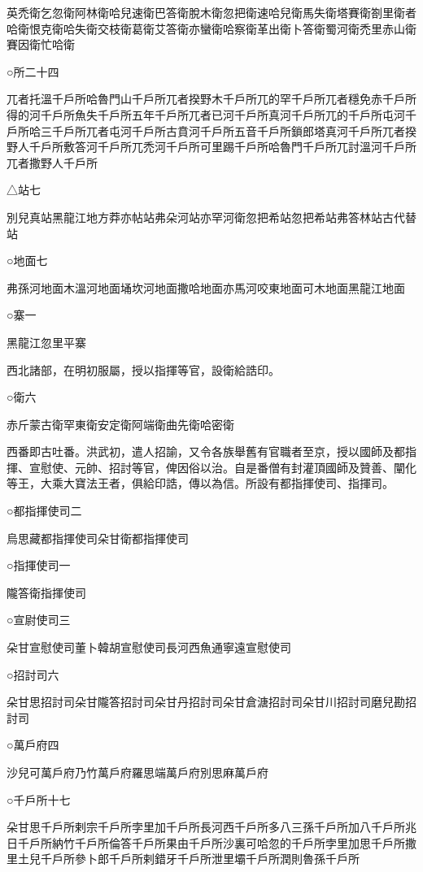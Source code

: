 英禿衛乞忽衛阿林衛哈兒速衛巴答衛脫木衛忽把衛速哈兒衛馬失衛塔賽衛劄里衛者哈衛恨克衛哈失衛交枝衛葛衛艾答衛亦蠻衛哈察衛革出衛卜答衛蜀河衛禿里赤山衛賽因衛忙哈衛

○所二十四

兀者托溫千戶所哈魯門山千戶所兀者揆野木千戶所兀的罕千戶所兀者穩免赤千戶所得的河千戶所魚失千戶所五年千戶所兀者已河千戶所真河千戶所兀的千戶所屯河千戶所哈三千戶所兀者屯河千戶所古賁河千戶所五音千戶所鎖郎塔真河千戶所兀者揆野人千戶所敷答河千戶所兀禿河千戶所可里踢千戶所哈魯門千戶所兀討溫河千戶所兀者撒野人千戶所

△站七

別兒真站黑龍江地方莽亦帖站弗朵河站亦罕河衛忽把希站忽把希站弗答林站古代替站

○地面七

弗孫河地面木溫河地面埇坎河地面撒哈地面亦馬河咬東地面可木地面黑龍江地面

○寨一

黑龍江忽里平寨

西北諸部，在明初服屬，授以指揮等官，設衛給誥印。

○衛六

赤斤蒙古衛罕東衛安定衛阿端衛曲先衛哈密衛

西番即古吐番。洪武初，遣人招諭，又令各族舉舊有官職者至京，授以國師及都指揮、宣慰使、元帥、招討等官，俾因俗以治。自是番僧有封灌頂國師及贊善、闡化等王，大乘大寶法王者，俱給印誥，傳以為信。所設有都指揮使司、指揮司。

○都指揮使司二

烏思藏都指揮使司朵甘衛都指揮使司

○指揮使司一

隴答衛指揮使司

○宣尉使司三

朵甘宣慰使司董卜韓胡宣慰使司長河西魚通寧遠宣慰使司

○招討司六

朵甘思招討司朵甘隴答招討司朵甘丹招討司朵甘倉溏招討司朵甘川招討司磨兒勘招討司

○萬戶府四

沙兒可萬戶府乃竹萬戶府羅思端萬戶府別思麻萬戶府

○千戶所十七

朵甘思千戶所剌宗千戶所孛里加千戶所長河西千戶所多八三孫千戶所加八千戶所兆日千戶所納竹千戶所倫答千戶所果由千戶所沙裏可哈忽的千戶所孛里加思千戶所撒里土兒千戶所參卜郎千戶所剌錯牙千戶所泄里壩千戶所潤則魯孫千戶所

